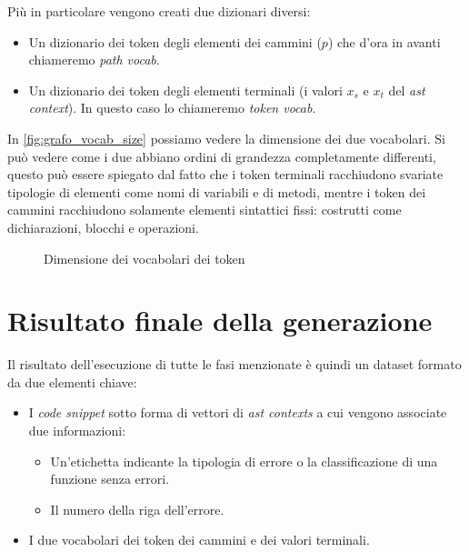 Più in particolare vengono creati due dizionari diversi:
  \begin{itemize}
    \item Un dizionario dei token degli elementi dei cammini ($p$) che d'ora in avanti chiameremo \textit{path vocab}.
    \item Un dizionario dei token degli elementi terminali (i valori $x_s$ e $x_t$ del \textit{ast context}). In questo caso lo chiameremo \textit{token vocab}.
  \end{itemize}
In \autoref{fig:grafo_vocab_size} possiamo vedere la dimensione dei due vocabolari.
Si può vedere come i due abbiano ordini di grandezza completamente differenti, questo può essere spiegato dal fatto che i token terminali racchiudono svariate tipologie di elementi come nomi di variabili e di metodi,
mentre i token dei cammini racchiudono solamente elementi sintattici fissi: costrutti come dichiarazioni, blocchi e operazioni.

  \begin{figure}
    \centering
    \caption{Dimensione dei vocabolari dei token}
    \label{fig:grafo_vocab_size}
\end{figure}

\section{Risultato finale della generazione}
Il risultato dell'esecuzione di tutte le fasi menzionate è quindi un dataset formato da due elementi chiave:
    \begin{itemize}
        \item I \textit{code snippet} sotto forma di vettori di \textit{ast contexts} a cui vengono associate due informazioni:
        \begin{itemize}
            \item Un'etichetta indicante la tipologia di errore o la classificazione di una funzione senza errori.
            \item Il numero della riga dell'errore.
        \end{itemize}
        \item I due vocabolari dei token dei cammini e dei valori terminali.
    \end{itemize}

